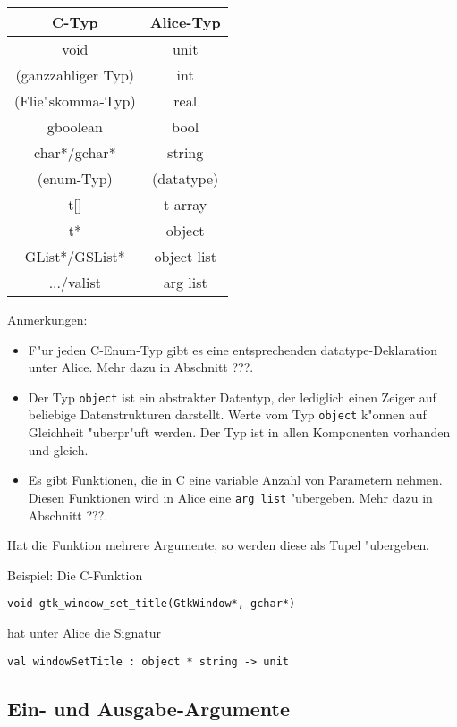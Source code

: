 \documentclass{article}
\begin{document}
\begin{tabular}{|c|c|}
\hline \textbf{C-Typ}     & \textbf{Alice-Typ} \\
\hline void               & unit       \\
\hline (ganzzahliger Typ) & int        \\
\hline (Flie"skomma-Typ)  & real       \\
\hline gboolean           & bool       \\
\hline char*/gchar*       & string     \\
\hline (enum-Typ)         & (datatype) \\
\hline t[]                & t array    \\
\hline t*                 & object     \\
\hline GList*/GSList*     & object list\\
\hline .../valist         & arg list\\
\hline
\end{tabular}

Anmerkungen:

\begin{itemize}
\item F"ur jeden C-Enum-Typ gibt es eine entsprechenden datatype-Deklaration
      unter Alice. Mehr dazu in Abschnitt ???.

\item Der Typ \texttt{object} ist ein abstrakter Datentyp, der lediglich einen
      Zeiger auf beliebige Datenstrukturen darstellt. Werte vom Typ
      \texttt{object} k"onnen auf Gleichheit "uberpr"uft werden. Der Typ ist
      in allen Komponenten vorhanden und gleich.

\item Es gibt Funktionen, die in C eine variable Anzahl von Parametern nehmen.
      Diesen Funktionen wird in Alice eine \texttt{arg list} "ubergeben.
      Mehr dazu in Abschnitt ???.

\end{itemize}

Hat die Funktion mehrere Argumente, so werden diese als Tupel "ubergeben.

Beispiel: Die C-Funktion
 
\texttt{void gtk\_window\_set\_title(GtkWindow*, gchar*)}

hat unter Alice die Signatur

\texttt{val windowSetTitle : object * string -> unit}

\subsection{Ein- und Ausgabe-Argumente}
\end{document}
